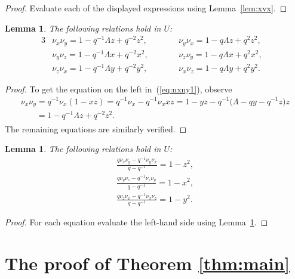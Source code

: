 \documentclass[pdftex]{sigma}
\numberwithin{equation}{section}
\newtheorem{Lemma}[Theorem]{Lemma}
\begin{document}
\begin{proof}
Evaluate each of the displayed expressions
using
Lemma~\ref{lem:xvx}.
\end{proof}

\begin{Lemma}
\label{lem:nxny}
The following relations hold in
$U$:
\begin{alignat}{3}
& \nu_x \nu_y = 1- q^{-1}\Lambda z + q^{-2} z^2,
\qquad &&
\nu_y \nu_x = 1- q\Lambda z + q^2 z^2,&
\label{eq:nxny1}
\\
& \nu_y \nu_z = 1- q^{-1}\Lambda x + q^{-2} x^2,
\qquad &&
\nu_z \nu_y = 1- q\Lambda x + q^2 x^2,&
\label{eq:nxny2}
\\
& \nu_z \nu_x = 1- q^{-1}\Lambda y + q^{-2} y^2,
\qquad &&
\nu_x \nu_z = 1- q\Lambda y + q^2 y^2.&
\label{eq:nxny3}
\end{alignat}
\end{Lemma}

\begin{proof}
To get the equation on the left in~(\ref{eq:nxny1}), observe
\begin{gather*}
\nu_x \nu_y  =  q^{-1}\nu_x (1-xz) =q^{-1}\nu_x -q^{-1} \nu_x x z
= 1-yz -q^{-1}\big(\Lambda - qy-q^{-1}z\big)z
\\
\phantom{\nu_x \nu_y}{}  =  1-q^{-1}\Lambda z + q^{-2}z^2.
\end{gather*}
The remaining equations are similarly verif\/ied.
\end{proof}


\begin{Lemma}
\label{lem:comnxny}
The following relations hold in
$U$:
\begin{gather}
\frac{q\nu_x\nu_y - q^{-1} \nu_y \nu_x}{q-q^{-1}}  =  1-z^2,
\label{eq:c1}
\\
\frac{q\nu_y\nu_z - q^{-1} \nu_z \nu_y}{q-q^{-1}}  =  1-x^2,
\label{eq:c2}
\\
\frac{q\nu_z\nu_x - q^{-1} \nu_x \nu_z}{q-q^{-1}}  =  1-y^2.
\label{eq:c3}
\end{gather}
\end{Lemma}

\begin{proof}
 For each equation evaluate the left-hand side using
Lemma~\ref{lem:nxny}.
\end{proof}

\section{The proof of Theorem  \ref{thm:main}}\label{section4}
\end{document}
